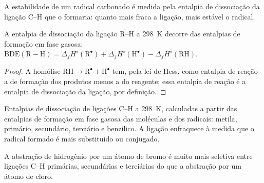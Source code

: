 A estabilidade de um radical carbonado é medida pela entalpia de dissociação
da ligação C--H que o formaria: quanto mais fraca a ligação, mais
estável o radical.

\begin{proposition}\label{prop:b3:radicals-carbenes:bde}
A entalpia de dissociação da ligação R--H a \qty{298}{K} decorre das entalpias de formação
em fase gasosa: $\mathrm{BDE(R{-}H)} = \Delta_fH^\circ(\mathrm R^\bullet) + \Delta_fH^\circ(\mathrm H^\bullet) - \Delta_fH^\circ(\mathrm{RH})$.
\end{proposition}

\begin{proof}
A homólise $\mathrm{RH \to R^\bullet + H^\bullet}$ tem, pela lei de Hess, como entalpia de reação a de formação dos produtos
menos a do reagente; essa entalpia de reação é a entalpia de dissociação da ligação,
por definição.
\end{proof}

\begin{omfigure}

{\small Entalpias de dissociação de ligações C--H a \qty{298}{K}, calculadas a partir das entalpias
de formação em fase gasosa das moléculas e dos radicais: metila, primário,
secundário, terciário e benzílico. A ligação enfraquece à medida que o radical formado é
mais substituído ou conjugado.}
\end{omfigure}

\begin{proposition}\label{prop:b3:radicals-carbenes:halogenation-selectivity}
A abstração de hidrogênio por um átomo de bromo é muito mais seletiva entre ligações C--H
primárias, secundárias e terciárias do que a abstração por um átomo de cloro.
\end{proposition}

